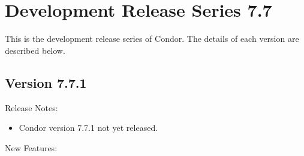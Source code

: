 
\section{\label{sec:History-7-7}Development Release Series 7.7}

This is the development release series of Condor.
The details of each version are described below.

\subsection*{\label{sec:New-7-7-1}Version 7.7.1}

\noindent Release Notes:

\begin{itemize}

\item Condor version 7.7.1 not yet released.

\end{itemize}


\noindent New Features:


